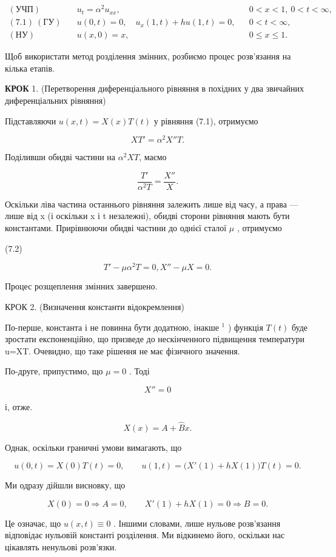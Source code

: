 \documentclass[
  ukrainian,
]{article}
\begin{document}
\[
\begin{aligned}
(\text{УЧП})\quad & u_t = \alpha^2 u_{xx}, && 0 < x < 1,\ 0 < t < \infty, \\
(7.1)\ (\text{ГУ})\quad & u(0,t) = 0,\quad u_x(1,t) + h u(1,t) = 0, && 0 < t < \infty, \\
(\text{НУ})\quad & u(x,0) = x, && 0 \leq x \leq 1.
\end{aligned}
\]

Щоб використати метод розділення змінних, розбиємо процес розв'язання на
кілька етапів.

\textbf{КРОК} 1. (Перетворення диференціального рівняння в похідних у
два звичайних диференціальних рівняння)

Підставляючи \(u(x,t)=X(x)T(t)\) у рівняння (7.1), отримуємо

\[
XT'=\alpha^2X''T.
\]

Поділивши обидві частини на \(\alpha^2XT\), маємо

\[
\frac{T'}{\alpha^2 T} = \frac{X''}{X} .
\]

Оскільки ліва частина останнього рівняння залежить лише від часу, а
права --- лише від x (і оскільки x і t незалежні), обидві сторони
рівняння мають бути константами. Прирівнюючи обидві частини до однієї
сталої \(\mu\) , отримуємо

(7.2)

\[
T' - \mu \alpha^{2} T = 0, X'' - \mu X = 0.
\]

Процес розщеплення змінних завершено.

КРОК 2. (Визначення константи відокремлення)

По-перше, константа і не повинна бути додатною, інакше \(^{1}\) )
функція \(T\left( t\right)\) буде зростати експоненційно, що призведе до
нескінченного підвищення температури u=XT. Очевидно, що таке рішення не
має фізичного значення.

По-друге, припустимо, що \(\mu = 0\) . Тоді

\[
X'' = 0
\]

і, отже.

\[
X(x) = A + \hat{B}x.
\]

Однак, оскільки граничні умови вимагають, що

\[
u(0, t) = X(0) T(t) = 0, \qquad u(1,t)=\bigl(X'(1)+hX(1)\bigr)T(t)=0.
\]

Ми одразу дійшли висновку, що

\[
X(0)=0\Rightarrow A=0,\qquad X'(1)+hX(1)=0\Rightarrow B=0.
\]

Це означає, що \(u(x, t) \equiv 0\) . Іншими словами, лише нульове
розв'язання відповідає нульовій константі розділення. Ми відкинемо його,
оскільки нас цікавлять ненульові розв'язки.
\end{document}
